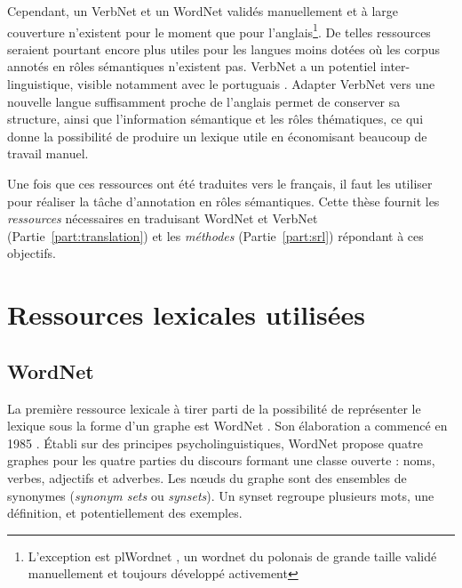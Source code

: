 Cependant, un VerbNet et un WordNet validés manuellement et à large couverture
n'existent pour le moment que pour l'anglais\footnote{L'exception est plWordnet
\citep{maziarz2012approaching}, un wordnet du polonais de grande taille validé
manuellement et toujours développé activement}. De telles ressources seraient
pourtant encore plus utiles pour les langues moins dotées où les corpus annotés
en rôles sémantiques n'existent pas.  VerbNet a un potentiel
inter-linguistique, visible notamment avec le portuguais \citep[section
2.2.2]{kipperschuler2005verbnet}. Adapter VerbNet vers une nouvelle langue
suffisamment proche de l'anglais permet de conserver sa structure, ainsi que
l'information sémantique et les rôles thématiques, ce qui donne la possibilité
de produire un lexique utile en économisant beaucoup de travail manuel.

Une fois que ces ressources ont été traduites vers le français, il faut les
utiliser pour réaliser la tâche d'annotation en rôles sémantiques. Cette thèse
fournit les \textit{ressources} nécessaires en traduisant WordNet et VerbNet
(Partie~\ref{part:translation}) et les \textit{méthodes} (Partie~\ref{part:srl})
répondant à ces objectifs.

\section{Ressources lexicales utilisées}
\label{ressources_utilisees}

\subsection{WordNet}
\label{presentation_wordnet}

La première ressource lexicale à tirer parti de la possibilité de représenter
le lexique sous la forme d'un graphe est WordNet \citep{fellbaum1998wordnet}.
Son élaboration a commencé en 1985 \citep{miller1990introduction}. Établi sur
des principes psycholinguistiques, WordNet propose quatre graphes pour les
quatre parties du discours formant une classe ouverte : noms, verbes,
adjectifs et adverbes. Les nœuds du graphe sont des ensembles de synonymes
(\textit{synonym sets} ou \textit{synsets}). Un synset regroupe plusieurs mots, une
définition, et potentiellement des exemples.


